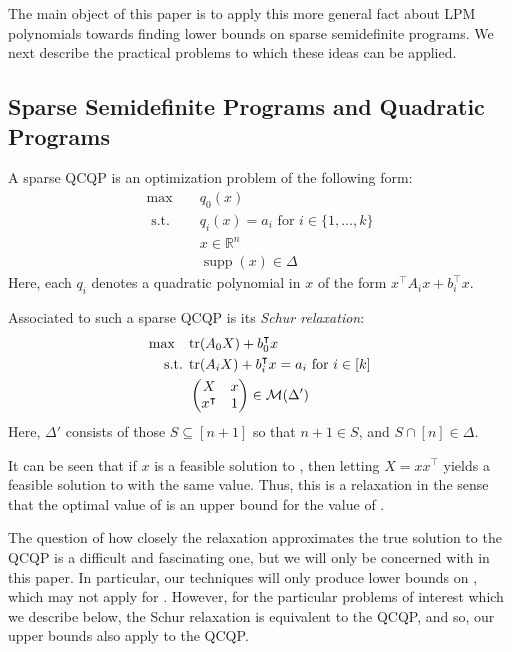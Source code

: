 \documentclass{amsart}
\theoremstyle{definition}
\newcommand{\R}{\mathbb{R}}
\newcommand{\tr}{\textup{tr}}
\newcommand{\M}{\mathcal{M}}
\DeclareMathOperator*{\supp}{supp}
\newcommand{\st}{{\text{ s.t. }}}
\begin{document}
The main object of this paper is to apply this more general fact about LPM polynomials towards finding lower bounds on sparse semidefinite programs.
We next describe the practical problems to which these ideas can be applied.
\subsection{Sparse Semidefinite Programs and Quadratic Programs}
A sparse QCQP is an optimization problem of the following form:\cite{TODO}
\begin{equation}\label{eq:sparse_qcqp}
    \begin{aligned}
        \max\quad & q_0(x) \\
        \st\quad & q_i(x) = a_i \text{ for }i \in \{1, \dots, k\}\\
            &x \in \R^n\\
            &\supp(x) \in \Delta
    \end{aligned}
\end{equation}
Here, each $q_i$ denotes a quadratic polynomial in $x$ of the form $x^{\intercal} A_i x + b_i^{\intercal} x$.

Associated to such a sparse QCQP is its \emph{Schur relaxation}\cite{TODO}:
\begin{equation}\label{eq:sparse_sdp}
    \begin{aligned}
        \max\quad & \tr(A_0 X) + b_0^{\intercal} x\\
        \st & \tr(A_i X) + b_i^{\intercal} x = a_i \text{ for }i \in [k]\\
            &\begin{pmatrix}
                X & x\\
                x^{\intercal} & 1
            \end{pmatrix} \in \M(\Delta')
    \end{aligned}
\end{equation}
Here, $\Delta'$ consists of those $S \subseteq [n+1]$ so that $n+1 \in S$, and $S \cap [n] \in \Delta$.

It can be seen that if $x$ is a feasible solution to , then letting $X = xx^{\intercal}$ yields a feasible solution to  with the same value.
Thus, this is a relaxation in the sense that the optimal value of  is an upper bound for the value of .

The question of how closely the relaxation approximates the true solution to the QCQP is a difficult and fascinating one, but we will only be concerned with  in this paper.
In particular, our techniques will only produce lower bounds on , which may not apply for .
However, for the particular problems of interest which we describe below, the Schur relaxation is equivalent to the QCQP, and so, our upper bounds also apply to the QCQP.
\end{document}
